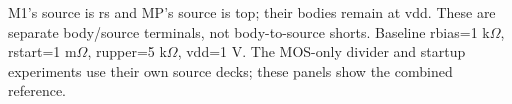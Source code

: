 \par
M1's source is rs and MP's source is top; their bodies remain at vdd. These are separate body/source terminals, not body-to-source shorts. Baseline rbias=1 k$\Omega$, rstart=1 m$\Omega$, rupper=5 k$\Omega$, vdd=1 V. The MOS-only divider and startup experiments use their own source decks; these panels show the combined reference.
